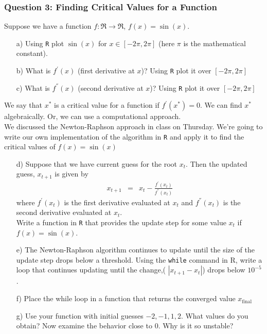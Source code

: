 \documentclass[12pt,letterpaper]{article}
\begin{document}
\subsubsection*{Question 3: Finding Critical Values for a Function}

Suppose we have a function $f:\Re\rightarrow\Re$, $f(x) = \sin(x)$.  
\begin{itemize}
\item[a)] Using {\tt R} plot $\sin(x)$ for $x \in [-2 \pi, 2 \pi] $ (here $\pi$ is the mathematical constant). 
\item[b)] What is $f^{'}(x)$ (first derivative at $x$)?  Using {\tt R} plot it over $[-2 \pi, 2 \pi]$
\item[c)] What is $f^{''}(x)$ (second derivative at $x$)? Using {\tt R} plot it over $[-2 \pi, 2 \pi]$
\end{itemize}
We say that $x^{*}$ is a critical value for a function if $f^{'}(x^{*}) = 0$.  We can find $x^{*}$ algebraically. Or, we can use a computational approach.\\
\noindent We discussed the Newton-Raphson approach in class on Thursday.  We're going to write our own implementation of the algorithm in {\tt R} and apply it to find the critical values of $f(x) = \sin(x)$ 
\begin{itemize}
\item[d)] Suppose that we have current guess for the root $x_{t}$.  Then the updated guess, $x_{t+1}$ is given by
\begin{eqnarray}
x_{t+1} & = & x_{t} - \frac{f^{'}(x_{t})}{f^{''}(x_{t})} \nonumber 
\end{eqnarray}
\noindent where $f^{'}(x_{t})$ is the first derivative evaluated at $x_{t}$ and $f^{''}(x_{t})$ is the second derivative evaluated at $x_{t}$.  \\
\noindent Write a function in {\tt R} that provides the update step for some value $x_{t}$ if $f(x) = \sin(x)$.  
\item[e)] The Newton-Raphson algorithm continues to update until the size of the update step drops below a threshold.  Using the {\tt while} command in R, write a loop that continues updating until the change,( $|x_{t+1} - x_{t}|$) drops below $10^{-5}$.  
\item[f)] Place the while loop in a function that returns the converged value $x_{\text{final}}$
\item[g)] Use your function with initial guesses $-2, -1, 1, 2$.  What values do you obtain?  Now examine the behavior close to $0$.  Why is it so unstable?
\end{itemize}
\end{document}
